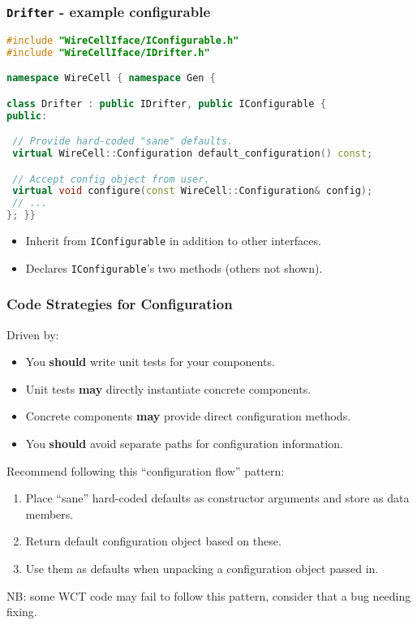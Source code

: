 \documentclass[xcolor=dvipsnames]{beamer}
\begin{document}
\begin{frame}[fragile]
  \frametitle{\texttt{Drifter} - example configurable}

\begin{lstlisting}[language=C++]
#include "WireCellIface/IConfigurable.h"
#include "WireCellIface/IDrifter.h"

namespace WireCell { namespace Gen {

class Drifter : public IDrifter, public IConfigurable {
public:

 // Provide hard-coded "sane" defaults.
 virtual WireCell::Configuration default_configuration() const;

 // Accept config object from user.
 virtual void configure(const WireCell::Configuration& config);
 // ...
}; }}
\end{lstlisting}

\begin{itemize}\footnotesize
\item Inherit from \texttt{IConfigurable} in addition to other interfaces.
\item Declares \texttt{IConfigurable}'s two methods (others not shown).
\end{itemize}

\end{frame}

\begin{frame}[fragile]
  \frametitle{Code Strategies for Configuration}

  Driven by:
  \begin{itemize}\footnotesize
  \item You \textbf{should} write unit tests for your components.
  \item Unit tests \textbf{may} directly instantiate concrete components.
  \item Concrete components \textbf{may} provide direct configuration methods.
  \item You \textbf{should} avoid separate paths for configuration information.
  \end{itemize}

  Recommend following this ``configuration flow'' pattern:
  \begin{enumerate}
  \item Place ``sane'' hard-coded defaults as constructor arguments
    and store as data members.
  \item Return default configuration object based on these.
  \item Use them as defaults when unpacking a configuration object
    passed in.
  \end{enumerate}

  \vfill \footnotesize NB: some WCT code may fail to follow this
  pattern, consider that a bug needing fixing.

\end{frame}
\end{document}
